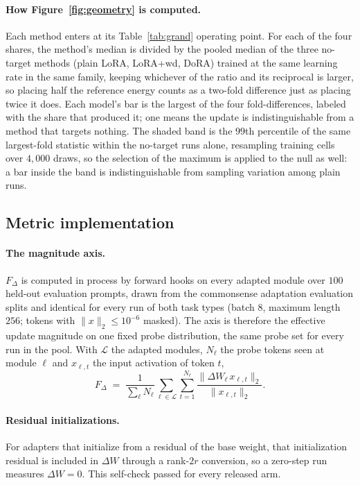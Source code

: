 \documentclass[11pt]{article}
\newcommand{\dw}{F_{\Delta}}
\begin{document}
\paragraph{How Figure~\ref{fig:geometry} is computed.} Each method enters
at its Table~\ref{tab:grand} operating point. For each of the four shares,
the method's median is divided by the pooled median of the three no-target
methods (plain LoRA, LoRA{+}wd, DoRA) trained at the same learning rate in
the same family, keeping whichever of the ratio and its reciprocal is
larger, so placing half the reference energy counts as a two-fold difference
just as placing twice it does. Each model's bar is the largest of the four
fold-differences, labeled with the share that produced it; one means the
update is indistinguishable from a method that targets nothing. The shaded
band is the $99$th percentile of the same largest-fold statistic within
the no-target runs alone, resampling training cells over $4{,}000$ draws,
so the selection of the maximum is applied to the null as well: a bar
inside the band is indistinguishable from sampling variation among plain
runs.

\subsection{Metric implementation}\label{app:metrics}

\paragraph{The magnitude axis.} $\dw$ is computed in process by forward hooks
on every adapted module over $100$ held-out evaluation prompts, drawn from the
commonsense adaptation evaluation splits and identical for every run of both
task types (batch $8$, maximum length $256$; tokens with $\lVert x\rVert_2 \le
10^{-6}$ masked). The axis is therefore the effective update magnitude on one
fixed probe distribution, the same probe set for every run in the pool. With
$\mathcal{L}$ the adapted modules, $N_\ell$ the probe tokens seen at module
$\ell$ and $x_{\ell,t}$ the input activation of token $t$,
\begin{equation}\label{eq:fdelta}
  \dw \;=\; \frac{1}{\sum_{\ell} N_\ell}
  \sum_{\ell\in\mathcal{L}} \sum_{t=1}^{N_\ell}
  \frac{\lVert \Delta W_\ell\, x_{\ell,t} \rVert_2}{\lVert x_{\ell,t} \rVert_2}.
\end{equation}

\paragraph{Residual initializations.} For adapters that initialize from a
residual of the base weight, that initialization residual is included in
$\Delta W$ through a rank-$2r$ conversion, so a zero-step run measures $\Delta
W = 0$. This self-check passed for every released arm.
\end{document}
